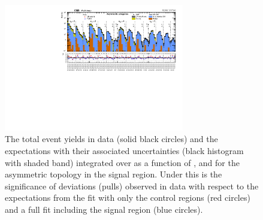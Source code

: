 \begin{figure}[!htb]
  \begin{center}
    \includegraphics[angle=90,width=0.7\textwidth]{figs/analysis/results/summaryPlot_Asymmetric_prefit_overlay_fit_b}
    \caption{The total event yields in data (solid black circles)
      and the \SM expectations with their associated uncertainties (black
      histogram with shaded band) integrated over \MHT as a function of
      \nj, \nb and \HT for the asymmetric topology in the
      signal region. Under this is the significance of deviations
      (pulls) observed in data with respect to the \SM expectations
      from the fit with only the control regions (red circles) and a
      full fit including the signal region (blue circles).}
    \label{fig:asym}
  \end{center}
\end{figure}

